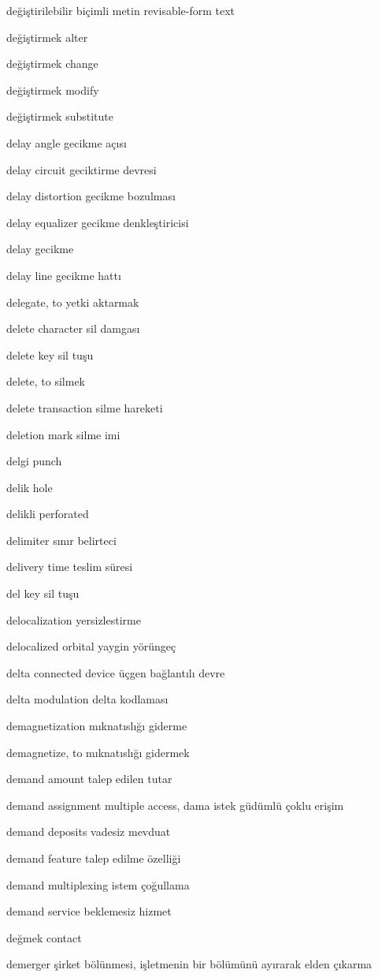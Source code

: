 \documentclass[12pt,fleqn]{article}\usepackage{../../common}
\begin{document}
değiştirilebilir biçimli metin revisable-form text

değiştirmek alter

değiştirmek change

değiştirmek modify

değiştirmek substitute

delay angle gecikme açısı

delay circuit geciktirme devresi

delay distortion gecikme bozulması

delay equalizer gecikme denkleştiricisi

delay gecikme

delay line gecikme hattı

delegate, to yetki aktarmak

delete character sil damgası

delete key sil tuşu

delete, to silmek

delete transaction silme hareketi

deletion mark silme imi

delgi punch

delik hole

delikli perforated

delimiter sınır belirteci

delivery time teslim süresi

del key sil tuşu

delocalization yersizlestirme

delocalized orbital yaygin yörüngeç

delta connected device üçgen bağlantılı devre

delta modulation delta kodlaması

demagnetization mıknatıslığı giderme

demagnetize, to mıknatıslığı gidermek

demand amount talep edilen tutar

demand assignment multiple access, dama istek güdümlü çoklu erişim

demand deposits vadesiz mevduat

demand feature talep edilme özelliği

demand multiplexing istem çoğullama

demand service beklemesiz hizmet

değmek contact

demerger şirket bölünmesi, işletmenin bir bölümünü ayırarak elden çıkarma
\end{document}
